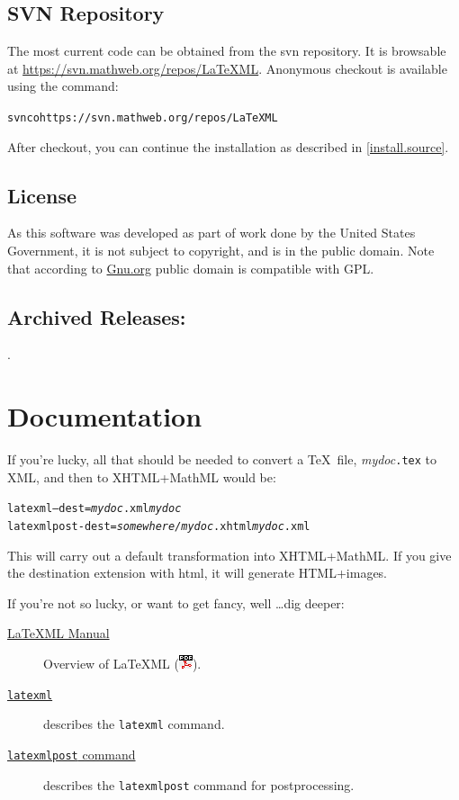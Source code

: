 \documentclass{article}
\newcommand{\PDFIcon}{\includegraphics{pdf}}
\begin{document}
\subsection{SVN Repository}\label{download.svn}
The most current code can be obtained from the svn repository.
It is browsable at \url{https://svn.mathweb.org/repos/LaTeXML}.
Anonymous checkout is available using the command:
\begin{alltt}
  svn co https://svn.mathweb.org/repos/LaTeXML
\end{alltt}
After checkout, you can continue the installation
as described in \ref{install.source}.

\subsection{License}\label{license}
As this software was developed as part of work done by the
United States Government, it is not subject to copyright,
and is in the public domain.
Note that according to
\href{http://www.gnu.org/licences/license-list.html#PublicDomain}{Gnu.org}
public domain is compatible with GPL.

\subsection{Archived Releases:}\label{archive}
\AllReleases.

\section{Documentation}\label{docs}
If you're lucky, all that should be needed to convert
a \TeX\ file, \textit{mydoc}\texttt{.tex} to XML, and
then to XHTML+MathML would be:
\begin{alltt}
   latexml --dest=\textit{mydoc}.xml \textit{mydoc}
   latexmlpost -dest=\textit{somewhere/mydoc}.xhtml \textit{mydoc}.xml
\end{alltt}
This will carry out a default transformation into XHTML+MathML.  If you
give the destination extension with html, it will generate HTML+images.

If you're not so lucky, or want to get fancy, well \ldots dig deeper:
\begin{description}
\item[\href{manual/index.xhtml}{LaTeXML Manual}]
    Overview of LaTeXML (\href{manual.pdf}{\PDFIcon}).
\item[\href{manual/commands/latexml.xhtml}{\texttt{latexml}}]
    describes the \texttt{latexml} command.
\item[\href{manual/commands/latexmlpost.xhtml}{\texttt{latexmlpost} command}]
   describes the \texttt{latexmlpost} command for postprocessing.
\end{description}
\end{document}

